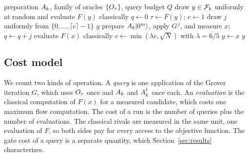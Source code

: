 \begin{algorithm}[t]
\caption{Quantum minimum finding over $\Fk$ (D\"urr--H{\o}yer with BBHT search)}\label{alg:dh}
\begin{algorithmic}[1]
\Require preparation $A_k$, family of oracles $\{O_\tau\}$, query budget $Q$
\State draw $y\in\mathcal{F}_k$ uniformly at random and evaluate $F(y)$ classically 
\State $q\gets 0$
  \State $\tau\gets F(y)$; $c\gets 1$ 
  \Repeat
    \State draw $j$ uniformly from $\{0,\dots,\lceil c\rceil-1\}$
     \Return $y$ \EndIf
    \State prepare $A_k\lvert 0^m \rangle$, apply $G^{\,j}$, and measure $x$; $q\gets q+j$ 
    \State evaluate $F(x)$ classically 
    \State $c\gets\min(\lambda c,\sqrt{N})$ with $\lambda=6/5$
  \State $y\gets x$
\EndWhile
\State \Return $y$
\end{algorithmic}
\end{algorithm}

\subsection{Cost model}\label{sec:interface-cost}
We count two kinds of operation. A \emph{query} is one application of the Grover iteration $G$, which uses $O_\tau$ once and $A_k$ and $A_k^{\dagger}$ once each. An \emph{evaluation} is the classical computation of $F(x)$ for a measured candidate, which costs one maximum flow computation. The cost of a run is the number of queries plus the number of evaluations. The classical rivals are measured in the same unit, one evaluation of $F$, so both sides pay for every access to the objective function. The gate cost of a query is a separate quantity, which Section~\ref{sec:results} characterizes.
